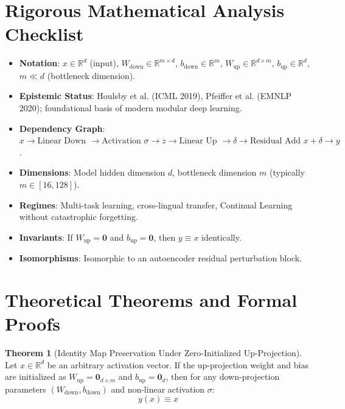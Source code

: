 \documentclass[11pt,a4paper]{article}
\theoremstyle{definition}
\newtheorem{theorem}{\textbf{Theorem}}[section]
\begin{document}
\section{Rigorous Mathematical Analysis Checklist}

\begin{itemize}
    \item \textbf{Notation}: $x \in \mathbb{R}^d$ (input), $W_{\text{down}} \in \mathbb{R}^{m \times d}$, $b_{\text{down}} \in \mathbb{R}^m$, $W_{\text{up}} \in \mathbb{R}^{d \times m}$, $b_{\text{up}} \in \mathbb{R}^d$, $m \ll d$ (bottleneck dimension).
    \item \textbf{Epistemic Status}: Houlsby et al. (ICML 2019), Pfeiffer et al. (EMNLP 2020); foundational basis of modern modular deep learning.
    \item \textbf{Dependency Graph}: $x \to \text{Linear Down } \to \text{Activation } \sigma \to z \to \text{Linear Up } \to \delta \to \text{Residual Add } x + \delta \to y$.
    \item \textbf{Dimensions}: Model hidden dimension $d$, bottleneck dimension $m$ (typically $m \in [16, 128]$).
    \item \textbf{Regimes}: Multi-task learning, cross-lingual transfer, Continual Learning without catastrophic forgetting.
    \item \textbf{Invariants}: If $W_{\text{up}} = \mathbf{0}$ and $b_{\text{up}} = \mathbf{0}$, then $y \equiv x$ identically.
    \item \textbf{Isomorphisms}: Isomorphic to an autoencoder residual perturbation block.
\end{itemize}

\section{Theoretical Theorems and Formal Proofs}

\begin{theorem}[Identity Map Preservation Under Zero-Initialized Up-Projection]
Let $x \in \mathbb{R}^d$ be an arbitrary activation vector. If the up-projection weight and bias are initialized as $W_{\text{up}} = \mathbf{0}_{d \times m}$ and $b_{\text{up}} = \mathbf{0}_d$, then for any down-projection parameters $(W_{\text{down}}, b_{\text{down}})$ and non-linear activation $\sigma$:
{\boldmath
\begin{equation}
y(x) \equiv x
\end{equation}
}
\end{theorem}
\end{document}
